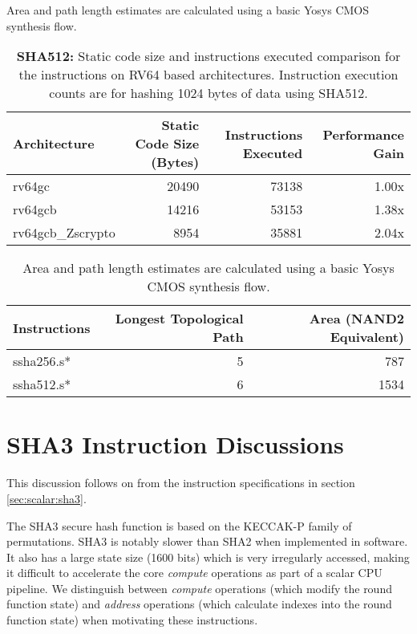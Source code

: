 Area and path length estimates are calculated using a basic Yosys CMOS
synthesis flow.

\begin{table}[h]
\centering
\begin{tabular}{lrrr}
Architecture      & Static Code Size (Bytes) & Instructions Executed & Performance Gain \\ \hline
rv64gc            & 20490                    & 73138 & 1.00x          \\
rv64gcb           & 14216                    & 53153 & 1.38x          \\
rv64gcb\_Zscrypto & 8954                     & 35881 & 2.04x 
\end{tabular}
\caption{{\bf SHA512:}
Static code size and instructions executed comparison for
the  instructions on RV64 based architectures.
Instruction execution counts are for hashing 1024 bytes of data
using SHA512.
}
\label{tab:benchmarks:sha512}
\end{table}

\begin{table}[h]
\centering
\begin{tabular}{lrr}
Instructions   & Longest Topological Path & Area (NAND2 Equivalent) \\ \hline
ssha256.s*     & 5                        & 787                   \\
ssha512.s*     & 6                        & 1534                  \\
\end{tabular}
\caption{
Area and path length estimates are calculated using a basic Yosys CMOS
synthesis flow.
}
\label{tab:benchmarks:sha2:rtl}
\end{table}

\newpage
\section{SHA3 Instruction Discussions}
\label{sec:appendix:sha3}

This discussion follows on from the instruction specifications
in section
\ref{sec:scalar:sha3}.


The SHA3 secure hash function \cite{nist:fips:202} is based on
the KECCAK-P family of permutations.
SHA3 is notably slower than SHA2 when implemented in software.
It also has a large state size (1600 bits) which is very irregularly
accessed, making it difficult to accelerate
the core {\em compute} operations as part of a scalar CPU pipeline.
We distinguish between {\em compute} operations (which modify the
round function state) and {\em address} operations (which calculate
indexes into the round function state) when motivating these instructions.

